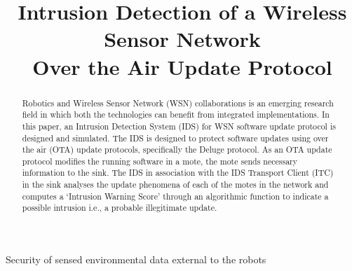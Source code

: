 \documentclass[conference,final]{IEEEtran}
\begin{document}
\title{Intrusion Detection of a Wireless Sensor Network\\Over the Air Update Protocol}
\author{
}



\maketitle


\begin{abstract}
Robotics and  Wireless Sensor Network (WSN) collaborations is an emerging research field in which both the technologies can benefit from integrated implementations.
In this paper, an Intrusion Detection System (IDS) for WSN  software update protocol is designed and simulated. 
The IDS is designed to protect software updates using over the air (OTA) update protocols, specifically the Deluge protocol.
As an OTA update protocol modifies the running software in a mote, the mote sends necessary information to the sink. 
The IDS in association with the IDS Transport Client (ITC) in the sink analyses the update phenomena of each of the
motes in the network and computes a `Intrusion Warning Score' through an algorithmic function to indicate a possible intrusion i.e., a probable illegitimate update.
\end{abstract}


%
\IEEEpeerreviewmaketitle %
Security of sensed environmental data external to the robots
\end{document}
